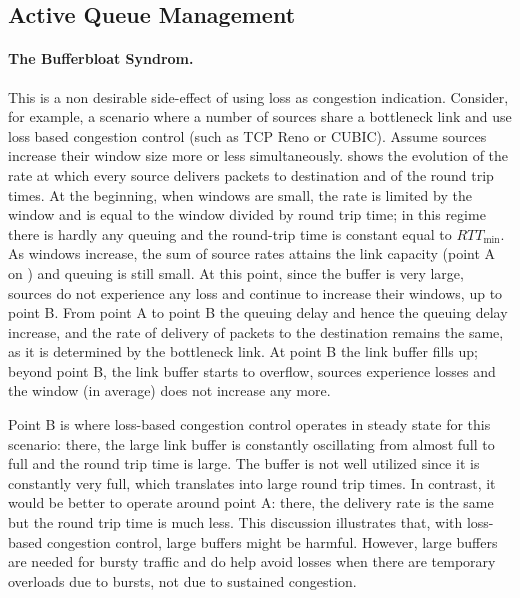 \subsection{Active Queue Management}
\paragraph{The Bufferbloat Syndrom.} This is a non desirable side-effect of using loss as congestion indication. Consider, for example, a scenario where a number of sources share a bottleneck link and use loss based congestion control (such as TCP Reno or CUBIC). Assume sources increase their window size more or less simultaneously.  shows the evolution of the rate at which every source delivers packets to destination and of the round trip times. At the beginning, when windows are small, the rate is limited by the window and is equal to the window divided by round trip time; in this regime there is hardly any queuing and the round-trip time is constant equal to $RTT_{\min}$. As windows increase, the sum of source rates attains the link capacity (point A on ) and queuing is still small. At this point, since the buffer is very large, sources do not experience any loss and continue to increase their windows, up to point B. From point A to point B the queuing delay and hence the queuing delay increase, and the rate of delivery of packets to the destination remains the same, as it is determined by the bottleneck link.  At point B the link buffer fills up; beyond point B, the  link buffer starts to overflow, sources experience losses and the window (in average) does not increase any more.

\begin{figure}[h]
        \protect\label{fig-bloat}
\end{figure}

Point B is where loss-based congestion control operates in steady state for this scenario: there, the large link buffer is constantly oscillating from almost full to full and the round trip time is large. The buffer is not well utilized since it is constantly very full, which translates into large round trip times. In contrast, it would be better to operate around point A: there, the delivery rate is the same but the round trip time is much less. This discussion illustrates that, with loss-based congestion control, large buffers might be harmful. However, large buffers are needed for bursty traffic and do help avoid losses when there are temporary overloads due to bursts, not due to sustained congestion.

